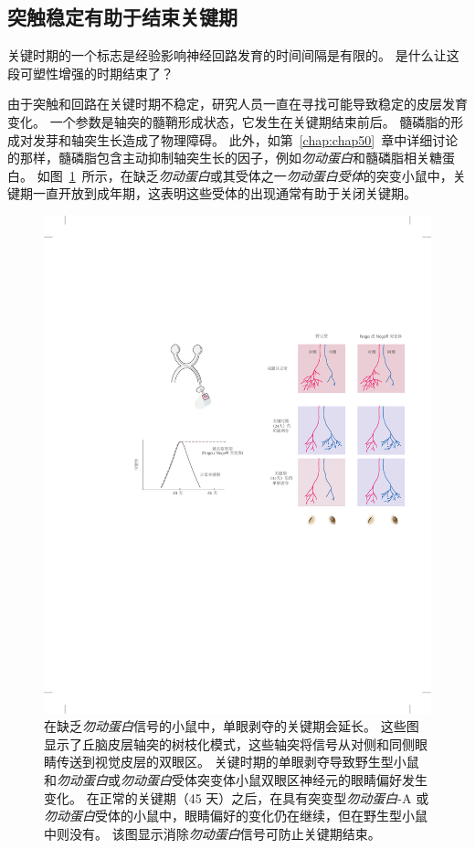 \subsection{突触稳定有助于结束关键期}

关键时期的一个标志是经验影响神经回路发育的时间间隔是有限的。
是什么让这段可塑性增强的时期结束了？


由于突触和回路在关键时期不稳定，研究人员一直在寻找可能导致稳定的皮层发育变化。
一个参数是轴突的髓鞘形成状态，它发生在关键期结束前后。
髓磷脂的形成对发芽和轴突生长造成了物理障碍。
此外，如第~\ref{chap:chap50}~章中详细讨论的那样，髓磷脂包含主动抑制轴突生长的因子，例如\textit{勿动蛋白}和髓磷脂相关糖蛋白。 
如图~\ref{fig:49_12}~所示，在缺乏\textit{勿动蛋白}或其受体之一\textit{勿动蛋白受体}的突变小鼠中，关键期一直开放到成年期，这表明这些受体的出现通常有助于关闭关键期。


\begin{figure}[htbp]
	\centering
	\includegraphics[width=1.0\linewidth]{chap49/fig_49_12}
	\caption{在缺乏\textit{勿动蛋白}信号的小鼠中，单眼剥夺的关键期会延长。
		这些图显示了丘脑皮层轴突的树枝化模式，这些轴突将信号从对侧和同侧眼睛传送到视觉皮层的双眼区。
		关键时期的单眼剥夺导致野生型小鼠和\textit{勿动蛋白}或\textit{勿动蛋白}受体突变体小鼠双眼区神经元的眼睛偏好发生变化。
		在正常的关键期（45 天）之后，在具有突变型\textit{勿动蛋白}-A 或\textit{勿动蛋白}受体的小鼠中，眼睛偏好的变化仍在继续，但在野生型小鼠中则没有。
		该图显示消除\textit{勿动蛋白}信号可防止关键期结束\cite{mcgee2005experience}。}
	\label{fig:49_12}
\end{figure}


